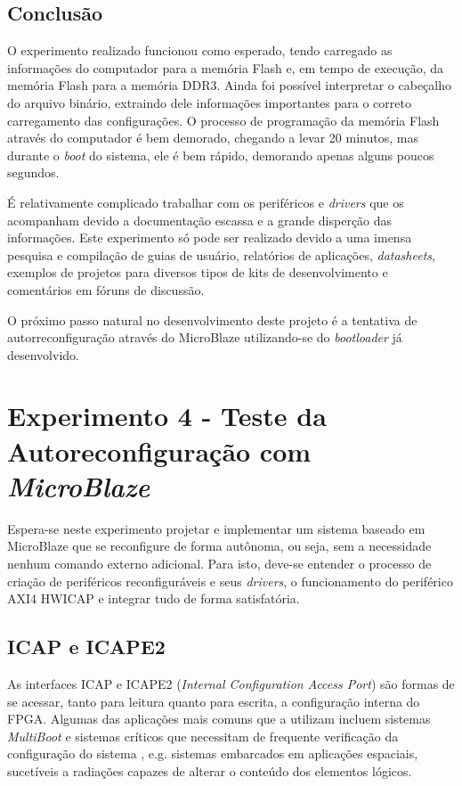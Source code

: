 \documentclass[11pt,a4paper,oneside]{book}
\begin{document}
\subsection{Conclusão}
O experimento realizado funcionou como esperado, tendo carregado as informações do computador para a memória Flash e, em tempo de execução, da memória Flash para a memória DDR3.
Ainda foi possível interpretar o cabeçalho do arquivo binário, extraindo dele informações importantes para o correto carregamento das configurações.
O processo de programação da memória Flash através do computador é bem demorado, chegando a levar 20 minutos, mas durante o \textit{boot} do sistema, ele é bem rápido, demorando apenas alguns poucos segundos.

É relativamente complicado trabalhar com os periféricos e \textit{drivers} que os acompanham devido a documentação escassa e a grande disperção das informações.
Este experimento só pode ser realizado devido a uma imensa pesquisa e compilação de guias de usuário, relatórios de aplicações, \textit{datasheets}, exemplos de projetos para diversos tipos de kits de desenvolvimento e comentários em fóruns de discussão.

O próximo passo natural no desenvolvimento deste projeto é a tentativa de autorreconfiguração através do MicroBlaze utilizando-se do \textit{bootloader} já desenvolvido.

\section{Experimento 4 - Teste da Autoreconfiguração com \textit{MicroBlaze}}
Espera-se neste experimento projetar e implementar um sistema baseado em MicroBlaze que se reconfigure de forma autônoma, ou seja, sem a necessidade nenhum comando externo adicional.
Para isto, deve-se entender o processo de criação de periféricos reconfiguráveis e seus \textit{drivers}, o funcionamento do periférico AXI4 HWICAP \cite{ds817} e integrar tudo de forma satisfatória.

\subsection{ICAP e ICAPE2}
As interfaces ICAP e ICAPE2 (\textit{Internal Configuration Access Port}) são formas de se acessar, tanto para leitura quanto para escrita, a configuração interna do FPGA.
Algumas das aplicações mais comuns que a utilizam incluem sistemas \textit{MultiBoot} \cite{xapp468, xapp1100} e sistemas críticos que necessitam de frequente verificação da configuração do sistema \cite{xapp468, xapp887}, e.g. sistemas embarcados em aplicações espaciais, sucetíveis a radiações capazes de alterar o conteúdo dos elementos lógicos. 
\end{document}
